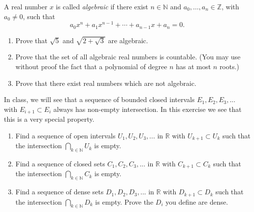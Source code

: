 \documentclass[12pt,letterpaper,reqno]{amsart}
\numberwithin{equation}{section}
\newcommand{\R}{\ensuremath{\mathbb R}}
\newcommand{\bbZ}{\ensuremath{\mathbb Z}}
\newcommand{\bbN}{{\mathbb N}}
\begin{document}
\begin{exercise}

A real number $x$ is called \emph{algebraic} if there exist $n \in \bbN$ and $a_0, \dots, a_n \in \bbZ$, with $a_0 \neq 0$, such that
\begin{equation*}
 a_0 x^n + a_1 x^{n-1} + \cdots + a_{n-1} x + a_n = 0.
\end{equation*}

\begin{enumerate}
\item
Prove that $\sqrt{5}$ and $\sqrt{2 + \sqrt{3}}$ are algebraic.

\item 
Prove that the set of all algebraic real numbers is countable.  (You may
use without proof the fact that a polynomial of degree $n$ has at most
$n$ roots.)

\item Prove that there exist real numbers which are not algebraic.
\end{enumerate}
\end{exercise}

\begin{exercise}[10 points] In class, we will see that a sequence of bounded closed intervals $E_1,E_2, E_3,... $  with $E_{i+1}\subset E_i$ always has non-empty intersection. In this exercise we see that this is a very special property. 
\begin{enumerate}
\item Find a sequence of open intervals $U_1, U_2, U_3, ...$ in $\R$ with $U_{k+1} \subset U_k$ such that the intersection $\bigcap_{k\in \mathbb{N}} U_k$ is empty.

\item Find a sequence of closed sets $C_1, C_2, C_3, ...$ in $\R$ with $C_{k+1} \subset C_k$ such that the intersection $\bigcap_{k\in \mathbb{N}} C_k$ is empty.

\item Find a sequence of dense sets $D_1, D_2, D_3, ...$ in $\R$ with $D_{k+1} \subset D_k$ such that the intersection $\bigcap_{k\in \mathbb{N}} D_k$ is empty. Prove the $D_i$ you define are dense.
\end{enumerate}
\end{exercise}
\end{document}
